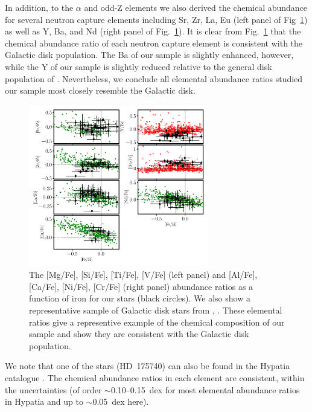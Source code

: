 \documentclass[a4paper,fleqn,usenatbib]{mnras}
\begin{document}
In addition, to the $\alpha$ and odd-Z elements we also derived the chemical abundance for several neutron capture elements including Sr, Zr, La, Eu (left panel of Fig~\ref{fig:ncap}) as well as Y, Ba, and Nd (right panel of Fig.~\ref{fig:ncap}).  It is clear from Fig.~\ref{fig:ncap}  that the chemical abundance ratio of each neutron capture element is consistent with the Galactic disk population. The Ba of our sample is slightly enhanced, however, while the Y of our sample is slightly reduced relative to the general disk population of \cite{Bensby2014}. Nevertheless, we conclude all elemental abundance ratios studied our sample most closely resemble the Galactic disk. 
\begin{figure}
\noindent\includegraphics[width=0.7\textwidth,keepaspectratio]{chem_ncap_pope.pdf}

\caption{\label{fig:ncap}
The [Mg/Fe], [Si/Fe], [Ti/Fe], [V/Fe] (left panel) and [Al/Fe], [Ca/Fe], [Ni/Fe], [Cr/Fe] (right panel) abundance ratios as a function of iron for our stars (black circles). We also show a representative sample of Galactic disk stars from \citet[open red square,][]{Bensby2014}, \citet[green circles][]{Battistini2016}. These elemental ratios give a representive example of the chemical composition of our sample and show they are consistent with the Galactic disk population. } %
\end{figure}


We note that one of the stars (HD~175740) can also be found in the Hypatia catalogue \citep{hypatia}. The chemical abundance ratios in each element are consistent, within the uncertainties (of order $\sim$0.10--0.15~dex for most elemental abundance ratios in Hypatia and up to $\sim$0.05~dex here). 
\end{document}
